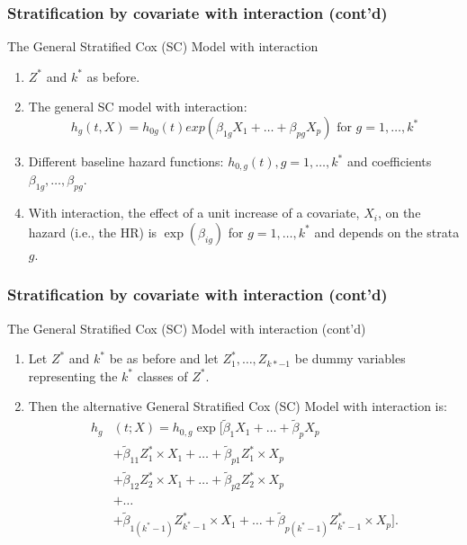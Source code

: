 \documentclass{beamer}
\theoremstyle{definition}
\begin{document}
\begin{frame}
\frametitle{Stratification by covariate with interaction (cont'd)}
\begin{block}{The General Stratified Cox (SC) Model with interaction}
\begin{enumerate}
\item $Z^*$ and $k^*$ as before.
\item The general SC model with interaction:
\begin{equation} \label{genSCint1}
h_g(t,X) = h_{0g}(t)exp(\beta_{1g} X_1 + \ldots + \beta_{pg} X_p) \text{ for }  g=1,\ldots,k^*
\end{equation}
\item Different baseline hazard functions: $h_{0,g}(t), g=1,\ldots,k^*$ and coefficients $\beta_{1g}, \ldots, \beta_{pg}$.
\item With interaction, the effect of a unit increase of a covariate, $X_i$, on the hazard (i.e., the HR) is $\exp(\beta_{ig})$ for $g=1,\ldots,k^*$ and depends on the strata $g$.
\end{enumerate}
\end{block}
\end{frame}

\begin{frame}
\frametitle{Stratification by covariate with interaction (cont'd)}
\begin{block}{The General Stratified Cox (SC) Model with interaction (cont'd)}
\begin{enumerate}
\item Let $Z^*$ and $k^*$ be as before and let $Z_1^*,\ldots,Z_{k*-1}$ be dummy variables representing the $k^*$ classes of $Z^*$.
\item Then the alternative General Stratified Cox (SC) Model with interaction is:
\begin{equation} \label{genSCint2}
\begin{aligned}
h_g&(t;X)= h_{0,g}\exp[\tilde{\beta}_1X_1 + \ldots + \tilde{\beta}_p X_p \\
&+\tilde{\beta}_{11}Z_1^*\times X_1 + \ldots + \tilde{\beta}_{p1}Z_1^*\times X_p \\
&+\tilde{\beta}_{12}Z_2^*\times X_1 + \ldots + \tilde{\beta}_{p2}Z_2^*\times X_p \\
&+\ldots \\
&+\tilde{\beta}_{1(k^*-1)}Z_{k^*-1}^*\times X_1 + \ldots + \tilde{\beta}_{p(k^*-1)}Z_{k^*-1}^*\times X_p]. \\
\end{aligned}
\end{equation}
\end{enumerate}
\end{block}
\end{frame}
\end{document}
